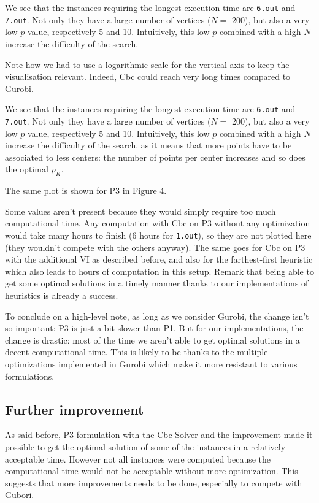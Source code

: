 \documentclass[a4paper,10pt]{article}
\begin{document}
We see that the instances requiring the longest execution time are \texttt{6.out} and \texttt{7.out}. Not only they have a large number of vertices ($N = $ 200), but also a very low $p$ value, respectively 5 and 10. Intuitively, this low $p$ combined with a high $N$ increase the difficulty of the search.


    Note how we had to use a logarithmic scale for the vertical axis to keep the visualisation relevant. Indeed, Cbc could reach very long times compared to Gurobi.

    We see that the instances requiring the longest execution time are \texttt{6.out} and \texttt{7.out}. Not only they have a large number of vertices ($N = $ 200), but also a very low $p$ value, respectively 5 and 10. Intuitively, this low $p$ combined with a high $N$ increase the difficulty of the search. as it means that more points have to be associated to less centers: the number of points per center increases and so does the optimal $\rho_K$.

	
\pagebreak

The same plot is shown for P3 in Figure 4.


Some values aren't present because they would simply require too much computational time. Any computation with Cbc on P3 without any optimization would take many hours to finish (6 hours for \texttt{1.out}), so they are not plotted here (they wouldn't compete with the others anyway). The same goes for Cbc on P3 with the additional VI as described before, and also for the farthest-first heuristic which also leads to hours of computation in this setup. Remark that being able to get some optimal solutions in a timely manner thanks to our implementations of heuristics is already a success.

To conclude on a high-level note, as long as we consider Gurobi, the change isn't so important: P3 is just a bit slower than P1. But for our implementations, the change is drastic: most of the time we aren't able to get optimal solutions in a decent computational time. This is likely to be thanks to the multiple optimizations implemented in Gurobi which make it more resistant to various formulations.

    
    \subsection{Further improvement}
    
    As said before, P3 formulation with the Cbc Solver and the improvement made it possible to get the optimal solution of some of the instances in a relatively acceptable time. However not all instances were computed because the computational time would not be acceptable without more optimization. This suggests that more improvements needs to be done, especially to compete with Gubori.
    
\end{document}
